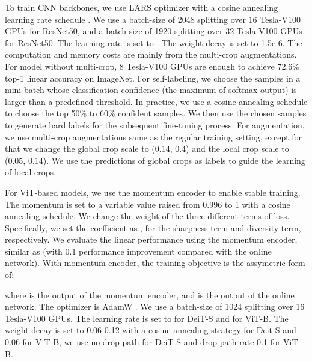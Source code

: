 \documentclass[10pt,twocolumn,letterpaper]{article}
\begin{document}
To train CNN backbones, we use LARS optimizer \cite{you2017scaling} with a cosine annealing learning rate schedule \cite{loshchilov2016sgdr}. We use a batch-size of 2048 splitting over 16 Tesla-V100 GPUs for ResNet50, and a batch-size of 1920 splitting over 32 Tesla-V100 GPUs for ResNet50. The learning rate is set to   . The weight decay is set to 1.5e-6. The computation and memory costs are mainly from the multi-crop augmentations. For model without multi-crop, 8 Tesla-V100 GPUs are enough to achieve 72.6\% top-1 linear accuracy on ImageNet. 
For self-labeling, we choose the samples in a mini-batch whose classification confidence (the maximum of softmax output) is larger than a predefined threshold. In practice, we use a cosine annealing schedule to choose the top 50\% to 60\% confident samples. We then use the chosen samples to generate hard labels for the subsequent fine-tuning process. For augmentation, we use multi-crop augmentations same as the regular training setting, except for that we change the global crop scale to (0.14, 0.4) and the local crop scale to (0.05, 0.14). We use the predictions of global crops as labels to guide the learning of local crops. 

For ViT-based models, we use the momentum encoder to enable stable training. The momentum is set to a variable value raised from 0.996 to 1 with a cosine annealing schedule. We change the weight of the three different terms of \ourmethod loss. Specifically, we set the coefficient as ,  for the sharpness term and diversity term, respectively. We evaluate the linear performance using the momentum encoder, similar as \cite{caron2021emerging} (with 0.1 performance improvement compared with the online network). 
With momentum encoder, the training objective is the assymetric form of:

\hspace{-0.2cm}

\vspace{-0.7cm}

where  is the output of the momentum encoder, and  is the output of the online network.
The optimizer is AdamW \cite{loshchilov2017decoupled}. We use a batch-size of 1024 splitting over 16 Tesla-V100 GPUs. The learning rate is set to    for DeiT-S and    for ViT-B. The weight decay is set to 0.06-0.12 with a cosine annealing strategy for Deit-S and 0.06 for ViT-B, we use no drop path for DeiT-S and drop path rate 0.1 for ViT-B.
\end{document}
